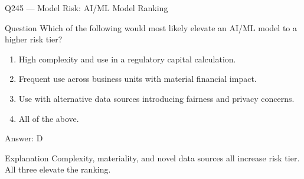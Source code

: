 \documentclass[aspectratio=169,8pt]{beamer}
\begin{document}
																																																				\begin{frame}{Q245 --- Model Risk: AI/ML Model Ranking}
																																																					\begin{block}{Question}
																																																						Which of the following would most likely elevate an AI/ML model to a higher risk tier?
																																																						\begin{enumerate}
																																																							\item High complexity and use in a regulatory capital calculation.
																																																							\item Frequent use across business units with material financial impact.
																																																							\item Use with alternative data sources introducing fairness and privacy concerns.
																																																							\item All of the above.
																																																						\end{enumerate}  \end{block}
																																																						\begin{exampleblock}{Answer: D}\end{exampleblock}
																																																						\begin{block}{Explanation}
																																																							Complexity, materiality, and novel data sources all increase risk tier. All three elevate the ranking.
																																																						\end{block}
																																																					\end{frame}
																																																					
\end{document}

